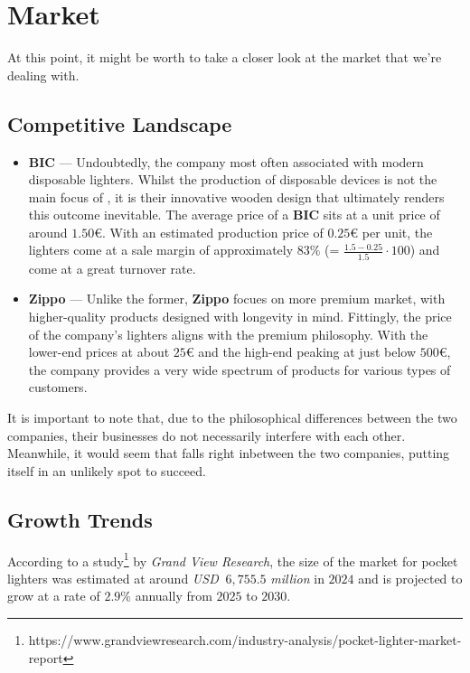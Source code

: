 \section{Market}
At this point, it might be worth to take a closer look at the market that we're dealing with.
\subsection{Competitive Landscape}
\begin{itemize}
	\item \textbf{BIC} --- Undoubtedly, the company most often associated with modern disposable lighters.
		Whilst the production of disposable devices is not the main focus of {\fw}, it is their innovative
		wooden design that ultimately renders this outcome inevitable. The average price of a \textbf{BIC} sits
		at a unit price of around $1.50$\euro. With an estimated production price of $0.25${\euro} per unit,
		the lighters come at a sale margin of approximately $83\%$ (= $\frac{1.5 - 0.25}{1.5} \cdot 100$) and
		come at a great turnover rate.
	\item \textbf{Zippo} --- Unlike the former, \textbf{Zippo} focues on more premium market, with higher-quality
		products designed with longevity in mind. Fittingly, the price of the company's lighters aligns with the
		premium philosophy. With the lower-end prices at about $25${\euro} and the high-end peaking
		at just below $500${\euro}, the company provides a very wide spectrum of products for various types of
		customers.
\end{itemize}
It is important to note that, due to the philosophical differences between the two companies, their businesses do not
necessarily interfere with each other. Meanwhile, it would seem that {\fw} falls right inbetween the two companies,
putting itself in an unlikely spot to succeed.
\newpage
\subsection{Growth Trends}
According to a study\footnote{https://www.grandviewresearch.com/industry-analysis/pocket-lighter-market-report}
by \textit{Grand View Research}, the size of the market for pocket lighters was estimated at
around \textit{USD} $\:6,755.5$ \textit{million} in $2024$ and is projected to grow at a rate of $2.9\%$ annually from
$2025$ to $2030$.

